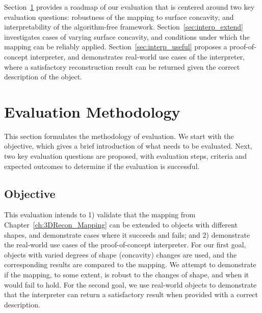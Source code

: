 Section~\ref{sec:interp_eval_methodology} provides a roadmap of our evaluation that is centered around two key evaluation questions: robustness of the mapping to surface concavity, and interpretability of the algorithm-free framework. Section~\ref{sec:interp_extend} investigates cases of varying surface concavity, and conditions under which the mapping can be reliably applied. Section~\ref{sec:interp_useful} proposes a proof-of-concept interpreter, and demonstrates real-world use cases of the interpreter, where a satisfactory reconstruction result can be returned given the correct description of the object.


\section{Evaluation Methodology}
\label{sec:interp_eval_methodology}
This section formulates the methodology of evaluation. We start with the objective, which gives a brief introduction of what needs to be evaluated. Next, two key evaluation questions are proposed, with evaluation steps, criteria and expected outcomes to determine if the evaluation is successful.

\subsection{Objective}
This evaluation intends to 1) validate that the mapping from Chapter~\ref{ch:3DRecon_Mapping} can be extended to objects with different shapes, and demonstrate cases where it succeeds and fails; and 2) demonstrate the real-world use cases of the proof-of-concept interpreter. For our first goal, objects with varied degrees of shape (concavity) changes are used, and the corresponding results are compared to the mapping. We attempt to demonstrate if the mapping, to some extent, is robust to the changes of shape, and when it would fail to hold. For the second goal, we use real-world objects to demonstrate that the interpreter can return a satisfactory result when provided with a correct description.

